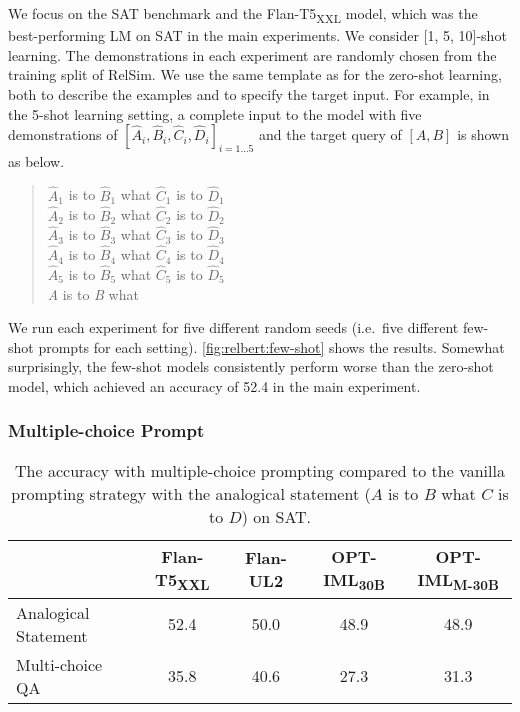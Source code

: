\documentclass[3p]{elsarticle}
\begin{document}
{%
We focus on the SAT benchmark and the Flan-T5\textsubscript{XXL} model, which was the best-performing LM on SAT in the main experiments. We consider [1, 5, 10]-shot learning. The demonstrations in each experiment are randomly chosen from the training split of RelSim. We use the same template as for the zero-shot learning, both to describe the examples and to specify the target input. For example, in the 5-shot learning setting, a complete input to the model with five demonstrations of $[\hat{A}_i, \hat{B}_i, \hat{C}_i, \hat{D}_i]_{i=1\dots 5}$ and the target query of $[A, B]$ is shown as below.
\begin{quote}
    $\hat{A}_1$ is to $\hat{B}_1$ what $\hat{C}_1$ is to $\hat{D}_1$ \\
    $\hat{A}_2$ is to $\hat{B}_2$ what $\hat{C}_2$ is to $\hat{D}_2$ \\
    $\hat{A}_3$ is to $\hat{B}_3$ what $\hat{C}_3$ is to $\hat{D}_3$ \\
    $\hat{A}_4$ is to $\hat{B}_4$ what $\hat{C}_4$ is to $\hat{D}_4$ \\
    $\hat{A}_5$ is to $\hat{B}_5$ what $\hat{C}_5$ is to $\hat{D}_5$ \\
    \textit{A} is to \textit{B} what
\end{quote}
We run each experiment for five different random seeds (i.e.\ five different few-shot prompts for each setting). \autoref{fig:relbert:few-shot} shows the results. Somewhat surprisingly, the few-shot models consistently perform worse than the zero-shot model, which achieved an accuracy of 52.4 in the main experiment.




\subsubsection{Multiple-choice Prompt}

\begin{table}[!t]
\centering
\begin{tabular}{lcccc}
\toprule
 &  Flan-T5\textsubscript{XXL} &  Flan-UL2 &  OPT-IML\textsubscript{30B} & OPT-IML\textsubscript{M-30B} \\
\midrule
Analogical Statement & 52.4 & 50.0 & 48.9  & 48.9 \\
Multi-choice QA &                35.8 &             40.6 &                         27.3 &                      31.3 \\
\bottomrule
\end{tabular}
\caption{The accuracy with multiple-choice prompting compared to the vanilla prompting strategy with the analogical statement ($A$ is to $B$ what $C$ is to $D$) on SAT.}
\label{tab:relbert:instruction}
\end{table}

}
\end{document}
